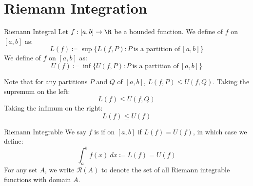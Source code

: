 \section{Riemann Integration}

\begin{dfnbox}{Riemann Integral}{}
    Let $f : [a,b] \to \R$ be a bounded function. We define  of $f$ on $[a,b]$ as:
    \[ L(f) \coloneq \sup\{ L(f,P) : P\ \text{is a partition of}\ [a,b] \} \]
    We define  of $f$ on $[a,b]$ as:
    \[ U(f) \coloneq \inf \{ U(f,P) : P\ \text{is a partition of}\ [a,b] \} \]
\end{dfnbox}

Note that for any partitions $P$ and $Q$ of $[a,b]$, $L(f,P) \leq U(f,Q)$. Taking the supremum on the left:
\[ L(f) \leq U(f, Q) \]
Taking the infimum on the right:
\[ L(f) \leq U(f) \]

\begin{dfnbox}{Riemann Integrable}{}
    We say $f$ is  if on $[a,b]$ if $L(f) = U(f)$, in which case we define:
    \[ \int_{a}^{b} f(x)\ dx \coloneq L(f) = U(f) \]
    For any set $A$, we write $\mathcal{R}(A)$ to denote the set of all Riemann integrable functions with domain $A$.
\end{dfnbox}

